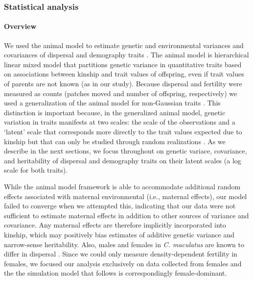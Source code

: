 \documentclass[11pt]{article}
\begin{document}
\subsubsection*{Statistical analysis}
\paragraph{Overview}
We used the animal model to estimate genetic and environmental variances and covariances of dispersal and demography traits \citep{lynch_genetics_1998,kruuk_estimating_2004,wilson_ecologists_2010}.
The animal model is hierarchical linear mixed model that partitions genetic variance in quantitative traits based on associations between kinship and trait values of offspring, even if trait values of parents are not known (as in our study).
Because dispersal and fertility were measured as counts (patches moved and number of offspring, respectively) we used a generalization of the animal model for non-Gaussian traits \citep{de2016general}.
This distinction is important because, in the generalized animal model, genetic variation in traits manifests at two scales: the scale of the observations and a `latent' scale that corresponds more directly to the trait values expected due to kinship but that can only be studied through random realizations \citep{de2016general}.
As we describe in the next sections, we focus throughout on genetic variace, covariance, and heritability of dispersal and demography traits on their latent scales (a log scale for both traits).

While the animal model framework is able to accommodate additional random effects associated with maternal environmental (i.e., maternal effects), our model failed to converge when we attempted this, indicating that our data were not sufficient to estimate maternal effects in addition to other sources of variance and covariance.
Any maternal effects are therefore implicitly incorporated into kinship, which may positively bias estimates of additive genetic variance and narrow-sense heritability.
Also, males and females in \textit{C. maculatus} are known to differ in dispersal \citep{miller_sex_2013,ochocki_rapid_2017}.
Since we could only measure density-dependent fertility in females, we focused our analysis exclusively on data collected from females and the the simulation model that follows is correspondingly female-dominant.
\end{document}
